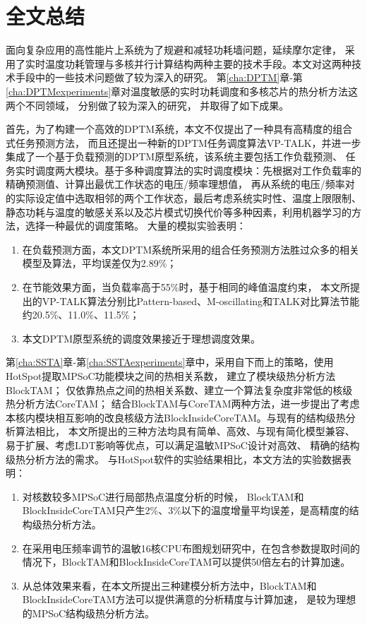 

\chapter{全文总结}
\label{cha:Conclusion}

面向复杂应用的高性能片上系统为了规避和减轻功耗墙问题，延续摩尔定律， 采用了实时温度功耗管理与多核并行计算结构两种主要的技术手段。本文对这两种技术手段中的一些技术问题做了较为深入的研究。
第\ref{cha:DPTM}章-第\ref{cha:DPTMexperiments}章对温度敏感的实时功耗调度和多核芯片的热分析方法这两个不同领域， 分别做了较为深入的研究， 并取得了如下成果。

首先，为了构建一个高效的DPTM系统，本文不仅提出了一种具有高精度的组合式任务预测方法， 而且还提出一种新的DPTM任务调度算法VP-TALK，并进一步集成了一个基于负载预测的DPTM原型系统，该系统主要包括工作负载预测、 任务实时调度两大模块。基于多种调度算法的实时调度模块：先根据对工作负载率的精确预测值、计算出最优工作状态的电压/频率理想值， 再从系统的电压/频率对的实际设定值中选取相邻的两个工作状态，最后考虑系统实时性、温度上限限制、 静态功耗与温度的敏感关系以及芯片模式切换代价等多种因素，利用机器学习的方法，选择一种最优的调度策略。
大量的模拟实验表明：
\begin{enumerate}[1)]
\item 在负载预测方面，本文DPTM系统所采用的组合任务预测方法胜过众多的相关模型及算法，平均误差仅为2.89\%；
\item 在节能效果方面，当负载率高于55\%时，基于相同的峰值温度约束， 本文所提出的VP-TALK算法分别比Pattern-based、M-oscillating和TALK对比算法节能约20.5\%、11.0\%、11.5\%；
\item 本文DPTM原型系统的调度效果接近于理想调度效果。
\end{enumerate}

第\ref{cha:SSTA}章-第\ref{cha:SSTAexperiments}章中，采用自下而上的策略，使用HotSpot提取MPSoC功能模块之间的热相关系数， 建立了模块级热分析方法BlockTAM； 仅依靠热点之间的热相关系数、建立一个算法复杂度非常低的核级热分析方法CoreTAM； 结合BlockTAM与CoreTAM两种方法，进一步提出了考虑本核内模块相互影响的改良核级方法BlockInsideCoreTAM。与现有的结构级热分析算法相比， 本文所提出的三种方法均具有简单、高效、与现有简化模型兼容、易于扩展、考虑LDT影响等优点，可以满足温敏MPSoC设计对高效、 精确的结构级热分析方法的需求。
与HotSpot软件的实验结果相比，本文方法的实验数据表明：
\begin{enumerate}[1)]
\item 对核数较多MPSoC进行局部热点温度分析的时候， BlockTAM和BlockInsideCoreTAM只产生2\%、3\%以下的温度增量平均误差，是高精度的结构级热分析方法。
\item 在采用电压频率调节的温敏16核CPU布图规划研究中，在包含参数提取时间的情况下，BlockTAM和BlockInsideCoreTAM可以提供50倍左右的计算加速。
\item 从总体效果来看，在本文所提出三种建模分析方法中，BlockTAM和BlockInsideCoreTAM方法可以提供满意的分析精度与计算加速， 是较为理想的MPSoC结构级热分析方法。
\end{enumerate} 